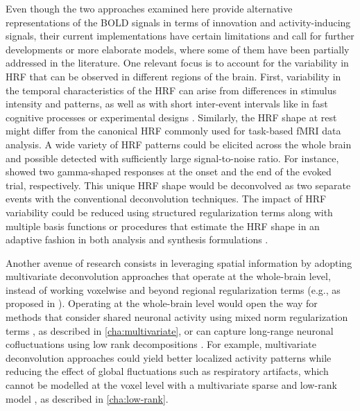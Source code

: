 Even though the two approaches examined here provide alternative representations
of the BOLD signals in terms of innovation and activity-inducing signals, their
current implementations have certain limitations and call for further
developments or more elaborate models, where some of them have been partially
addressed in the literature. One relevant focus is to account for the
variability in HRF that can be observed in different regions of the brain.
First, variability in the temporal characteristics of the HRF can arise from
differences in stimulus intensity and patterns, as well as with short
inter-event intervals like in fast cognitive processes or experimental designs
\citep{Yesilyurt2008DynamicsnonlinearitiesBOLD,
Sadaghiani2009Neuralactivityinduced,Chen2021Investigatingmechanismsfast,Polimeni2021Imagingfasterneural}.
Similarly, the HRF shape at rest might differ from the canonical HRF commonly
used for task-based fMRI data analysis. A wide variety of HRF patterns could be
elicited across the whole brain and possible detected with sufficiently large
signal-to-noise ratio. For instance, \cite{GonzalezCastillo2012Wholebraintime}
showed two gamma-shaped responses at the onset and the end of the evoked trial,
respectively. This unique HRF shape would be deconvolved as two separate events
with the conventional deconvolution techniques. The impact of HRF variability
could be reduced using structured regularization terms along with multiple basis
functions \citep{Gaudes2012Structuredsparsedeconvolution} or procedures that
estimate the HRF shape in an adaptive fashion in both analysis
\citep{Farouj2019BoldSignalDeconvolution} and synthesis formulations
\citep{Cherkaoui2021Multivariatesemiblind}.

Another avenue of research consists in leveraging spatial information by
adopting multivariate deconvolution approaches that operate at the whole-brain
level, instead of working voxelwise and beyond regional regularization terms
(e.g., as proposed in \cite{Karahanoglu2013TotalactivationfMRI}). Operating at
the whole-brain level would open the way for methods that consider shared
neuronal activity using mixed norm regularization terms
\citep{UrunuelaTremino2019Deconvolutionmultiecho}, as described in
\cref{cha:multivariate}, or can capture long-range neuronal cofluctuations using
low rank decompositions \citep{Cherkaoui2021Multivariatesemiblind}. For example,
multivariate deconvolution approaches could yield better localized activity
patterns while reducing the effect of global fluctuations such as respiratory
artifacts, which cannot be modelled at the voxel level with a multivariate
sparse and low-rank model \citep{Urunuela2021LowRankSparse}, as described in
\cref{cha:low-rank}.

